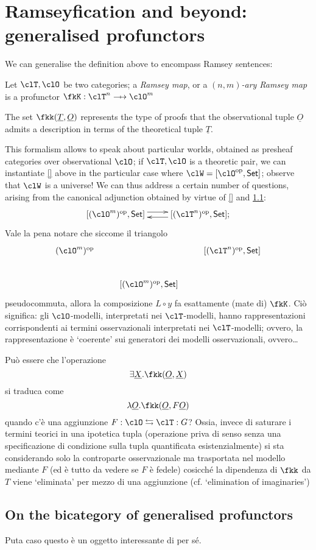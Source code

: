\documentclass[a4paper]{../birkjour}
\begin{document}
\section{Ramseyfication and beyond: generalised profunctors}
\label{sec:org50db6c2}
We can generalise the definition above to encompass Ramsey sentences:
\begin{definition}
  Let $\clT,\clO$ be two categories; a \emph{Ramsey map}, or a \emph{$(n,m)$-ary Ramsey map} is a profunctor $\fkK : \clT^n \pto \clO^m$
\end{definition}
The set $\fkk(\underline T, \underline O)$ represents the type of proofs that the observational tuple $\underline O$ admits a description in terms of the theoretical tuple $\underline T$.

This formalism allows to speak about particular worlds, obtained as presheaf categories over observational $\clO$; if $\clT, \clO$ is a theoretic pair, we can instantiate \autoref{} above in the particular case where $\clW = [\clO^\op, \Set]$; observe that $\clW$ is a universe! We can thus address a certain number of questions, arising from the canonical adjunction obtained by virtue of \autoref{} and \ref{}:
\[
  \xymatrix{ [(\clO^m)^\op, \Set] \ar@<3pt>[r] & \ar@<3pt>[l] [(\clT^n)^\op, \Set];}
\]
Vale la pena notare che siccome il triangolo
\[
\vcenter{\xymatrix{
  (\clO^m)^\op && [(\clT^n)^\op, \Set] \\
  & [(\clO^m)^\op, \Set]
}}
\]
pseudocommuta, allora la composizione $L\circ y$ fa esattamente (mate di) $\fkK$. Ciò significa: gli $\clO$-modelli, interpretati nei $\clT$-modelli, hanno rappresentazioni corrispondenti ai termini osservazionali interpretati nei $\clT$-modelli; ovvero, la rappresentazione è `coerente' sui generatori dei modelli osservazionali, ovvero\dots

Può essere che l'operazione 
\[\exists \underline X . \fkk(\underline O, \underline X)\]
si traduca come 
\[\lambda \underline O.\fkk(\underline O, F\underline O)\]
quando c'è una aggiunzione $F : \clO \leftrightarrows \clT : G$? Ossia, invece di saturare i termini teorici in una ipotetica tupla (operazione priva di senso senza una specificazione di condizione sulla tupla quantificata esistenzialmente) si sta considerando solo la controparte osservazionale ma trasportata nel modello mediante $F$ (ed è tutto da vedere se $F$ è fedele) cosicché la dipendenza di $\fkk$ da $T$ viene `eliminata' per mezzo di una aggiunzione (cf. `elimination of imaginaries')
\subsection{On the bicategory of generalised profunctors}
Puta caso questo è un oggetto interessante di per sé.
\end{document}
